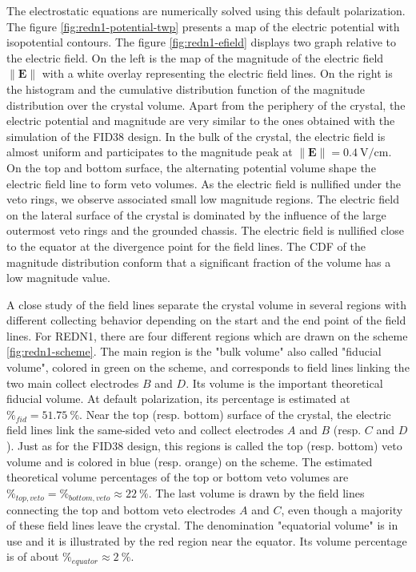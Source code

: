 The electrostatic equations are numerically solved using this default polarization. The figure \ref{fig:redn1-potential-twp} presents a map of the electric potential with isopotential contours. The  figure \ref{fig:redn1-efield} displays two graph relative to the electric field. On the left is the map of the magnitude of the electric field $\| \bm{E} \|$ with a white overlay representing the electric field lines. On the right is the histogram and the cumulative distribution function of the magnitude distribution over the crystal volume.
Apart from the periphery of the crystal, the electric potential and magnitude are very similar to the ones obtained with the simulation of the FID38 design. In the bulk of the crystal, the electric field is almost uniform and participates to the magnitude peak at $\| \bm{E} \| = \SI{0.4}{\volt\per\centi\meter}$. 
On the top and bottom surface, the alternating potential volume shape the electric field line to form veto volumes. As the electric field is nullified under the veto rings, we observe associated small low magnitude regions. 
The electric field on the lateral surface of the crystal is dominated by the influence of the large outermost veto rings and the grounded chassis. The electric field is nullified close to the equator at the divergence point for the field lines.
The CDF of the magnitude distribution conform that a significant fraction of the volume has a low magnitude value.

A close study of the field lines separate the crystal volume in several regions with different collecting behavior depending on the start and the end point of the field lines. For REDN1, there are four different regions which are drawn on the scheme \ref{fig:redn1-scheme}. 
The main region is the "bulk volume" also called "fiducial volume", colored in green on the scheme, and corresponds to field lines linking the two main collect electrodes $B$ and $D$. Its volume is the important theoretical fiducial volume. At default polarization, its percentage is estimated at $\%_{fid}=\SI{51.75}{\percent}$.
Near the top (resp. bottom) surface of the crystal, the electric field lines link the same-sided veto and collect electrodes $A$ and $B$ (resp. $C$ and $D$). Just as for the FID38 design, this regions is called the top (resp. bottom) veto volume and is colored in blue (resp. orange) on the scheme. The estimated theoretical volume percentages of the top or bottom veto volumes are $\%_{top,veto} = \%_{bottom,veto} \approx \SI{22}{\percent}$. 
The last volume is drawn by the field lines connecting the top and bottom veto electrodes $A$ and $C$, even though a majority of these field lines leave the crystal. The denomination "equatorial volume" is in use and it is illustrated by the red region near the equator. Its volume percentage is of about $\%_{equator} \approx \SI{2}{\percent}$.

